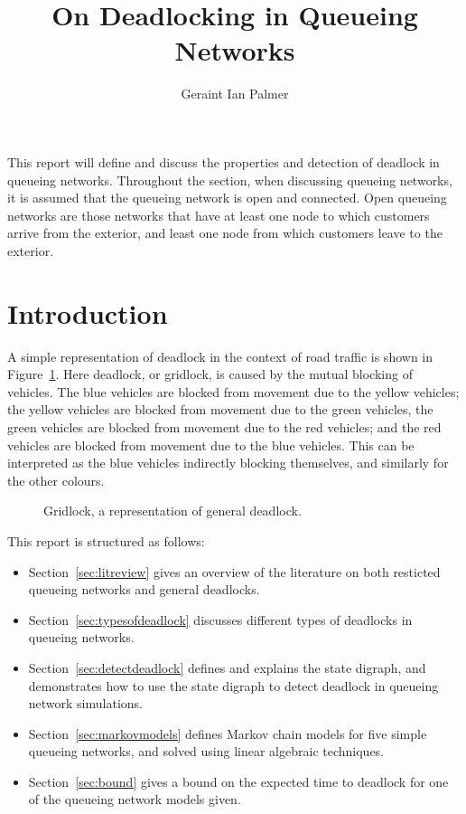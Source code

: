 \documentclass{article}
\title{On Deadlocking in Queueing Networks}
\author{Geraint Ian Palmer}
\date{}
\begin{document}
\onehalfspacing

\maketitle

This report will define and discuss the properties and detection of deadlock in queueing networks.
Throughout the section, when discussing queueing networks, it is assumed that
the queueing network is open and connected.
Open queueing networks are those networks that have at least one node to which customers arrive from the exterior, and least one node from which customers leave to the exterior.

\section{Introduction}

A simple representation of deadlock in the context of road traffic is shown in Figure~\ref{fig:gridlock}.
Here deadlock, or gridlock, is caused by the mutual blocking of vehicles.
The blue vehicles are blocked from movement due to the yellow vehicles; the yellow vehicles are blocked from movement due to the green vehicles, the green vehicles are blocked from movement due to the red vehicles; and the red vehicles are blocked from movement due to the blue vehicles.
This can be interpreted as the blue vehicles indirectly blocking themselves, and similarly for the other colours.

\begin{figure}[!htbp]
  \begin{center}
  
  \caption{Gridlock, a representation of general deadlock.}
  \label{fig:gridlock}
  \end{center}
\end{figure}

This report is structured as follows:

\begin{itemize}
  \item Section~\ref{sec:litreview} gives an overview of the literature on both resticted queueing networks and general deadlocks.
  \item Section~\ref{sec:typesofdeadlock} discusses different types of deadlocks in queueing networks.
  \item Section~\ref{sec:detectdeadlock} defines and explains the state digraph, and demonstrates how to use the state digraph to detect deadlock in queueing network simulations.
  \item Section~\ref{sec:markovmodels} defines Markov chain models for five simple queueing networks, and solved using linear algebraic techniques.
  \item Section~\ref{sec:bound} gives a bound on the expected time to deadlock for one of the queueing network models given.
\end{itemize}
\end{document}
